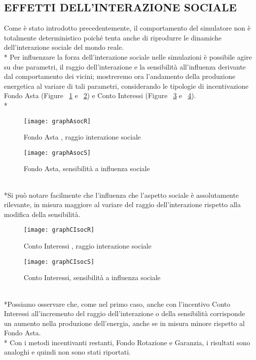\documentclass[12pt,a4paper,openright,twoside]{report}
\begin{document}
\subsection{EFFETTI DELL'INTERAZIONE SOCIALE}
Come è stato introdotto precedentemente, il comportamento del simulatore non è totalmente deterministico poiché tenta anche di riprodurre le dinamiche dell'interazione sociale del mondo reale.\\*
Per influenzare la forza dell'interazione sociale nelle simulazioni è possibile agire su due parametri, il raggio dell'interazione e la sensibilità all'influenza derivante dal comportamento dei vicini; mostreremo ora l'andamento della produzione energetica al variare di tali parametri, considerando le tipologie di incentivazione Fondo Asta (Figure ~\ref{graphAsocR} e ~\ref{graphAsocS}) e Conto Interessi (Figure ~\ref{graphCIsocR} e ~\ref{graphCIsocS}).\\*
\begin{figure}[hbt]
	\begin{center}
	\texttt{[image: graphAsocR]}
	\end{center}
	\caption{Fondo Asta , raggio interazione sociale}
  	\label{graphAsocR}
\end{figure}
\begin{figure}[hbt]
	\begin{center}
	\texttt{[image: graphAsocS]}
	\end{center}
	\caption{Fondo Asta, sensibilità a influenza sociale}
  	\label{graphAsocS}
\end{figure}
\\*Si può notare facilmente che l'influenza che l'aspetto sociale è assolutamente rilevante, in misura maggiore al variare del raggio dell'interazione rispetto alla modifica della sensibilità.
\begin{figure}[hbt]
	\begin{center}
	\texttt{[image: graphCIsocR]}
	\end{center}
	\caption{Conto Interessi , raggio interazione sociale}
  	\label{graphCIsocR}
\end{figure}
\begin{figure}[hbt]
	\begin{center}
	\texttt{[image: graphCIsocS]}
	\end{center}
	\caption{Conto Interessi,  sensibilità a influenza sociale}
  	\label{graphCIsocS}
\end{figure}
\\*Possiamo osservare che, come nel primo caso, anche con l'incentivo Conto Interessi all'incremento del raggio dell'interazione o della sensibilità corrisponde un aumento nella produzione dell'energia, anche se in misura minore rispetto al Fondo Asta.\\*
Con i metodi incentivanti restanti, Fondo Rotazione e Garanzia, i risultati sono analoghi e quindi non sono stati riportati.
\end{document}
